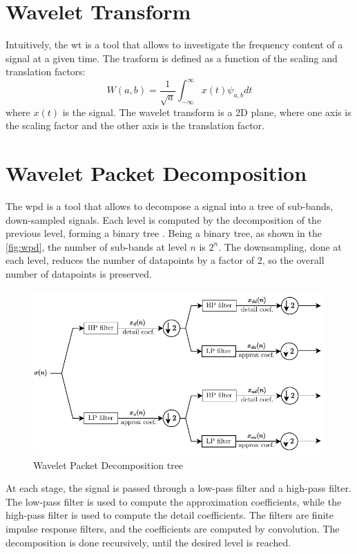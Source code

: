 \section{Wavelet Transform}
Intuitively, the \gls{wt} is a tool that allows to investigate the frequency content of a signal at a given time. The trasform is defined as a function of the scaling and translation factors:
\begin{equation}
W(a,b) =\frac{1}{\sqrt{a}} \int_{-\infty}^{\infty} x(t) \psi_{a,b} dt
\end{equation}
where $x(t)$ is the signal. The wavelet transform is a 2D plane, where one axis is the scaling factor and the other axis is the translation factor.

\section{Wavelet Packet Decomposition}
The \gls{wpd} is a tool that allows to decompose a signal into a tree of sub-bands, down-sampled signals. Each level is computed by the decomposition of the previous level, forming a binary tree \cite{akansu1991}. Being a binary tree, as shown in the \autoref{fig:wpd}, the number of sub-bands at level $n$ is $2^n$. The downsampling, done at each level, reduces the number of datapoints by a factor of 2, so the overall number of datapoints is preserved.

\begin{figure}
\centering
\includegraphics{images/wpd.pdf}
\caption{Wavelet Packet Decomposition tree}
\label{fig:wpd}
\end{figure}


At each stage, the signal is passed through a low-pass filter and a high-pass filter. The low-pass filter is used to compute the approximation coefficients, while the high-pass filter is used to compute the detail coefficients. The filters are finite impulse response filters, and the coefficients are computed by convolution. The decomposition is done recursively, until the desired level is reached.

